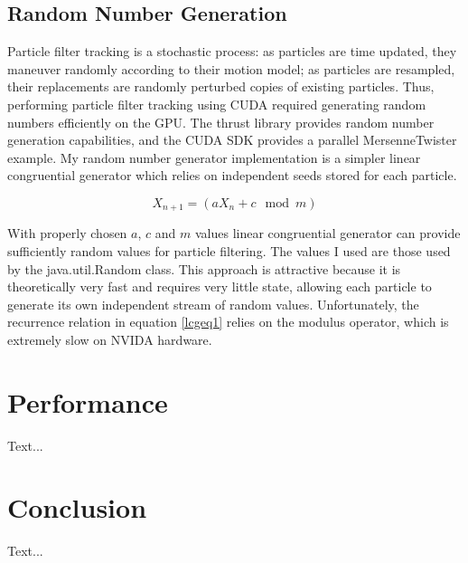 \documentclass{article}
\begin{document}
\subsection{Random Number Generation}
Particle filter tracking is a stochastic process: as particles are time updated, they maneuver randomly according to their motion model; as particles are resampled, their replacements are randomly perturbed copies of existing particles. Thus, performing particle filter tracking using CUDA required generating random numbers efficiently on the GPU. The thrust library provides random number generation capabilities, and the CUDA SDK provides a parallel MersenneTwister example. My random number generator implementation is a simpler linear congruential generator which relies on independent seeds stored for each particle.

\begin{equation}\label{lcgeq1}
X_{n+1}=(aX_{n}+c \mod m)
\end{equation}

With properly chosen \(a\), \(c\) and \(m\) values linear congruential generator can provide sufficiently random values for particle filtering\cite{lcg}. The values I used are those used by the java.util.Random class. This approach is attractive because it is theoretically very fast and requires very little state, allowing each particle to generate its own independent stream of random values. Unfortunately, the recurrence relation in equation \ref{lcgeq1} relies on the modulus operator, which is extremely slow on NVIDA hardware.\cite{oprc}

\section{Performance}
Text...

\section{Conclusion}
Text...
\end{document}
